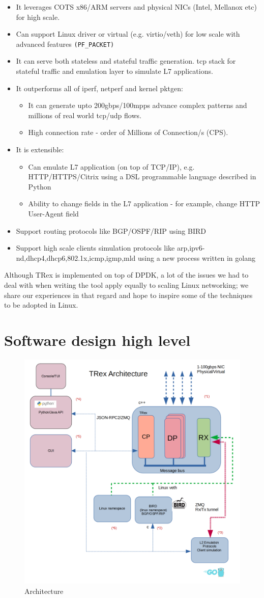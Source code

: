 \documentclass[conference]{IEEEtran}
\begin{document}
\begin{itemize}
\item It leverages COTS x86/ARM servers and physical NICs (Intel, Mellanox etc) for high scale.
\item Can support Linux driver or virtual (e.g. virtio/veth) for low scale with advanced features \texttt{(PF\_PACKET)}
\item It can serve both stateless and stateful traffic generation.
  tcp stack for stateful traffic and emulation layer to simulate L7 applications.
\item It outperforms all of iperf, netperf and kernel pktgen: 
   \begin{itemize}
    \item It can generate upto 200gbps/100mpps advance complex patterns and millions of real
      world tcp/udp flows.
    \item High connection rate - order of Millions of Connection/s (CPS).
  \end{itemize}
\item It is extensible:
\begin{itemize}
    \item Can emulate L7 application (on top of TCP/IP),
       e.g. HTTP/HTTPS/Citrix using a DSL programmable language described in Python 
    \item Ability to change fields in the L7 application - for example,
      change HTTP User-Agent field
\end{itemize}
\item Support routing protocols like BGP/OSPF/RIP using BIRD \cite{b4}
\item Support high scale clients simulation protocols like arp,ipv6-nd,dhcp4,dhcp6,802.1x,icmp,igmp,mld using a new process written in golang 
\end{itemize}
Although TRex is implemented on top of DPDK, a lot of the issues we had
to deal with when writing the tool apply equally to scaling Linux networking;
we share our experiences in that regard and hope to inspire some
of the techniques to be adopted in Linux.

\section{Software design high level}

\begin{figure}[h]
\includegraphics[width=0.4
\textwidth, center]{trex_arch_2.png}
\caption{Architecture}
\label{fig:arch}
\end{figure}
\end{document}
